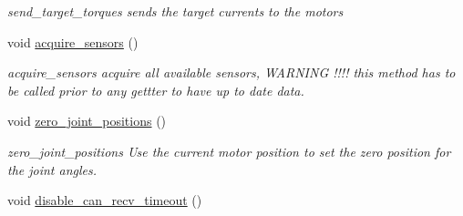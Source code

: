 \begin{DoxyCompactItemize}
\begin{DoxyCompactList}\small\item\em send\+\_\+target\+\_\+torques sends the target currents to the motors \end{DoxyCompactList}\item 
void \hyperlink{classblmc__robots_1_1SingleLeg_a093a696ad34f00e92adcc4eb282a37d9}{acquire\+\_\+sensors} ()
\begin{DoxyCompactList}\small\item\em acquire\+\_\+sensors acquire all available sensors, W\+A\+R\+N\+I\+NG !!!! this method has to be called prior to any gettter to have up to date data. \end{DoxyCompactList}\item 
void \hyperlink{classblmc__robots_1_1SingleLeg_a2d95b70a9aca9f7faf503fd5c62f067f}{zero\+\_\+joint\+\_\+positions} ()\hypertarget{classblmc__robots_1_1SingleLeg_a2d95b70a9aca9f7faf503fd5c62f067f}{}\label{classblmc__robots_1_1SingleLeg_a2d95b70a9aca9f7faf503fd5c62f067f}

\begin{DoxyCompactList}\small\item\em zero\+\_\+joint\+\_\+positions Use the current motor position to set the zero position for the joint angles. \end{DoxyCompactList}\item 
void \hyperlink{classblmc__robots_1_1SingleLeg_a39c69c6578b42df3d556e8a23c3e1861}{disable\+\_\+can\+\_\+recv\+\_\+timeout} ()\hypertarget{classblmc__robots_1_1SingleLeg_a39c69c6578b42df3d556e8a23c3e1861}{}\label{classblmc__robots_1_1SingleLeg_a39c69c6578b42df3d556e8a23c3e1861}


\end{DoxyCompactItemize}
